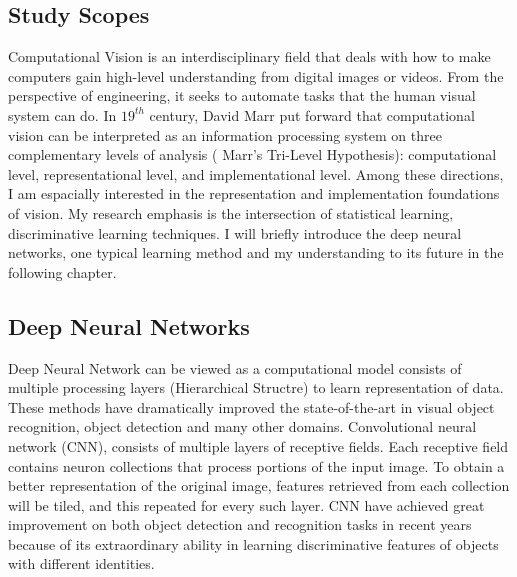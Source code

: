 \subsection{{Study Scopes}}
Computational Vision is an interdisciplinary field that deals with how to make computers gain high-level understanding from digital images or videos. From the perspective of engineering, it seeks to automate tasks that the human visual system can do\cite{dawson1998understanding,ballard1982computer,huang1996computer}.
In $19^{th}$ century, {{David Marr}} put forward that computational vision can be interpreted as an information processing system on three complementary levels of analysis {( Marr's Tri-Level Hypothesis)\cite{marr1976understanding}}: computational level, representational level, and implementational level. Among these directions, I am espacially interested in the representation and implementation foundations of vision. My research emphasis is the intersection of statistical learning, discriminative learning techniques. I will briefly introduce the deep neural networks, one typical learning method and my understanding to its future in the following chapter.


\subsection{{Deep Neural Networks}}
Deep Neural Network can be viewed as a computational model consists of multiple processing layers ({Hierarchical Structre}) to learn representation of data. These methods have dramatically improved the state-of-the-art in visual object recognition, object detection and many other domains. Convolutional neural network (CNN), consists of multiple layers of receptive fields. Each receptive field contains neuron collections that process portions of the input image. To obtain a better representation of the original image, features retrieved from each collection will be tiled, and this repeated for every such layer. {CNN} have achieved great improvement
on both object detection and recognition tasks in recent years because
of its extraordinary ability in learning discriminative features
of objects with different identities.

